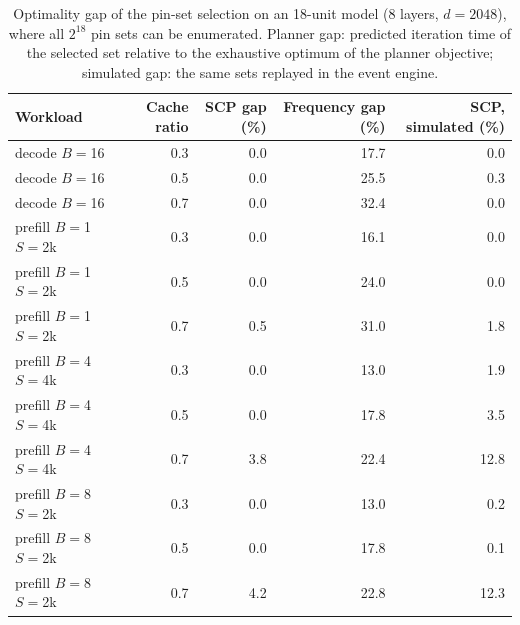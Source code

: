 \begin{table}[t]
\centering
\caption{Optimality gap of the pin-set selection on an 18-unit model (8 layers, $d{=}2048$), where all $2^{18}$ pin sets can be enumerated. Planner gap: predicted iteration time of the selected set relative to the exhaustive optimum of the planner objective; simulated gap: the same sets replayed in the event engine.}
\label{tab:gap}
\small
\begin{tabular}{lrrrr}
\toprule
\textbf{Workload} & \textbf{Cache ratio} & \textbf{SCP gap (\%)} & \textbf{Frequency gap (\%)} & \textbf{SCP, simulated (\%)}\\
\midrule
decode $B{=}$16 & 0.3 & 0.0 & 17.7 & 0.0\\
decode $B{=}$16 & 0.5 & 0.0 & 25.5 & 0.3\\
decode $B{=}$16 & 0.7 & 0.0 & 32.4 & 0.0\\
prefill $B{=}$1 $S{=}$2k & 0.3 & 0.0 & 16.1 & 0.0\\
prefill $B{=}$1 $S{=}$2k & 0.5 & 0.0 & 24.0 & 0.0\\
prefill $B{=}$1 $S{=}$2k & 0.7 & 0.5 & 31.0 & 1.8\\
prefill $B{=}$4 $S{=}$4k & 0.3 & 0.0 & 13.0 & 1.9\\
prefill $B{=}$4 $S{=}$4k & 0.5 & 0.0 & 17.8 & 3.5\\
prefill $B{=}$4 $S{=}$4k & 0.7 & 3.8 & 22.4 & 12.8\\
prefill $B{=}$8 $S{=}$2k & 0.3 & 0.0 & 13.0 & 0.2\\
prefill $B{=}$8 $S{=}$2k & 0.5 & 0.0 & 17.8 & 0.1\\
prefill $B{=}$8 $S{=}$2k & 0.7 & 4.2 & 22.8 & 12.3\\
\bottomrule
\end{tabular}
\end{table}
